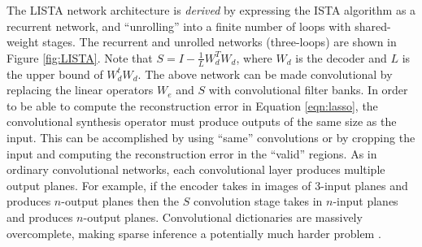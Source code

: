 The LISTA network architecture is \emph{derived} by expressing the ISTA
algorithm as a recurrent network, and ``unrolling'' into a finite number of
loops with shared-weight stages.  The recurrent and unrolled networks
(three-loops) are shown in Figure \ref{fig:LISTA}. Note that
$S=I-\frac{1}{L}W_d^T W_d$, where $W_d$ is the decoder and $L$ is the upper
bound of $W_d^t W_d$. The above network can be made convolutional by replacing
the linear operators $W_e$ and $S$ with convolutional filter banks. In order to
be able to compute the reconstruction error in Equation \ref{eqn:lasso}, the
convolutional synthesis operator must produce outputs of the same size as the
input. This can be accomplished by using ``same'' convolutions or by cropping
the input and computing the reconstruction error in the ``valid'' regions. As
in ordinary convolutional networks, each convolutional layer produces multiple
output planes. For example, if the encoder takes in images of 3-input planes
and produces $n$-output planes then the $S$ convolution stage takes in
$n$-input planes and produces $n$-output planes. Convolutional dictionaries are
massively overcomplete, making sparse inference a potentially much
harder problem \cite{ConvSC}. 

